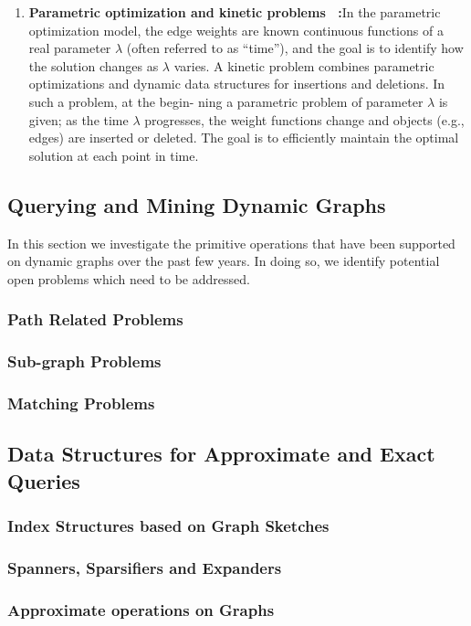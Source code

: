 \begin{enumerate}
	\item {\textbf{Parametric optimization and kinetic problems~\cite{agarwal1998parametric} :}}In the parametric optimization model, the edge weights are known continuous functions of a real parameter $\lambda$ (often referred to as “time”), and the goal is to identify how the solution changes as $\lambda$ varies. A kinetic problem combines parametric optimizations and dynamic data structures for insertions and deletions. In such a problem, at the begin- ning a parametric problem of parameter $\lambda$ is given; as the time $\lambda$ progresses, the weight functions change and objects (e.g., edges) are inserted or deleted. The goal is to efficiently maintain the optimal solution at each point in time.


\end{enumerate}



\subsection{Querying and Mining Dynamic Graphs}
\label{sec:query-mining}

In this section we investigate the primitive operations that have been supported on dynamic graphs over the past few years. In doing so, we identify potential open problems which need to be addressed. 


\subsubsection{Path Related Problems} 
\label{sec:path-problems}


\subsubsection{Sub-graph Problems}
\label{sec:subgraph-problems}


\subsubsection{Matching Problems}
\label{sec:matching-problems}


\subsection{Data Structures for Approximate and Exact Queries}
\label{sec:approx-exacts}

\subsubsection{Index Structures based on Graph Sketches}
\label{sec:indexing-dynamic-graphs}

\subsubsection{Spanners, Sparsifiers and Expanders}
\label{sec:spanners}

\subsubsection{Approximate operations on Graphs}
\label{sec:approximate-problems}



